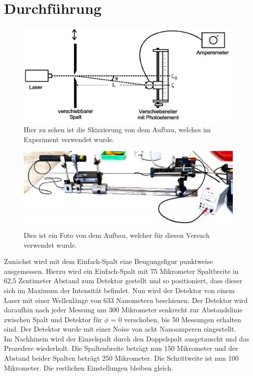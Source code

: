 \section{Durchführung}

\begin{figure}
    \centering
    \includegraphics[scale=0.5]{content/Beugung Aufbau.pdf}
    \caption{Hier zu sehen ist die Skizzierung von dem Aufbau, welches im Experiment verwendet wurde.}
    \label{fig:skaufbau}
\end{figure}

\begin{figure}
    \centering
    \includegraphics[scale=0.5]{content/Beugung Aufbau Real.pdf}
    \caption{Dies ist ein Foto von dem Aufbau, welcher für diesen Versuch verwendet wurde.}
    \label{fig:reaufbau}
\end{figure}

Zunächst wird mit dem Einfach-Spalt eine Beugungsfigur punktweise ausgemessen. Hierzu wird ein Einfach-Spalt mit 75 Mikrometer Spaltbreite in 62,5 Zentimeter Abstand zum Detektor gestellt und so positioniert, dass dieser sich im Maximum  der Intensität befindet. Nun wird der Detektor von einem Laser mit einer Wellenlänge von 633 Nanometern beschienen. Der Detektor wird daraufhin nach jeder Messung um 300 Mikrometer senkrecht zur Abstandslinie zwischen Spalt und Detektor für \(\phi\) = 0 verschoben, bis 50 Messungen erhalten sind. Der Detektor wurde mit einer Noise von acht Nanoamperen eingestellt.\\
Im Nachhinein wird der Einzelspalt durch den Doppelspalt ausgetauscht und das Prozedere wiederholt. Die Spaltenbreite beträgt nun 150 Mikrometer und der Abstand beider Spalten beträgt 250 Mikrometer. Die Schrittweite ist nun 100 Mikrometer. Die restlichen Einstellungen bleiben gleich.

\label{sec:Durchfuehrung}
